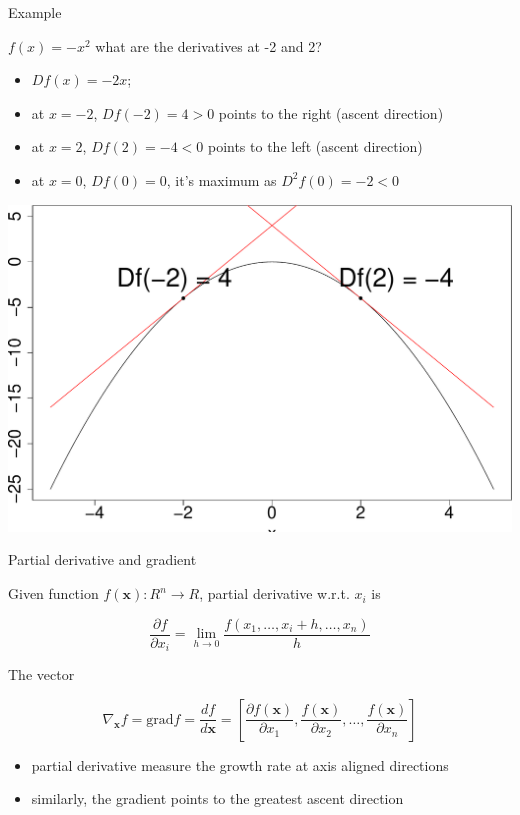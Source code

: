\documentclass{scrartcl}
\def\tightlist{}
\newcommand{\vv}[1]{\boldsymbol{#1}}
\begin{document}
\begin{frame}{Example}
\protect\hypertarget{example-3}{}

\(f(x) = -x^2\) what are the derivatives at -2 and 2?

\begin{itemize}
\tightlist
\item
  \(Df(x) = -2x\);
\item
  at \(x=-2\), \(Df(-2)=4 >0\) points to the right (ascent direction)
\item
  at \(x=2\), \(Df(2) =-4 <0\) points to the left (ascent direction)
\item
  at \(x=0\), \(Df(0) = 0\), it's maximum as \(D^2f(0) =-2<0\) \bigskip
\end{itemize}

\begin{center}\includegraphics[width=0.6\linewidth]{math4ml_files/figure-beamer/unnamed-chunk-11-1} \end{center}

\end{frame}

\begin{frame}{Partial derivative and gradient}
\protect\hypertarget{partial-derivative-and-gradient}{}

Given function \(f(\vv{x}): R^n\rightarrow R\), partial derivative
w.r.t. \(x_i\) is

\[\frac{\partial f}{\partial x_i} = \lim_{h \rightarrow 0} \frac{f(x_1, \ldots, x_i+h, \ldots, x_n)}{h} \]

The vector

\[\nabla_{\vv{x}}f=\text{grad} f = \frac{df}{d\vv{x}} = \left [\frac{\partial f(\vv{x})}{\partial x_1}, \frac{f(\vv{x})}{\partial x_2}, \ldots, \frac{f(\vv{x})}{\partial x_n}\right ]\]

\begin{itemize}
\tightlist
\item
  partial derivative measure the growth rate at axis aligned directions
\item
  similarly, the gradient points to the greatest ascent direction
\end{itemize}

\end{frame}
\end{document}
